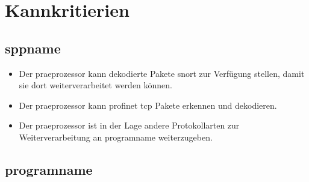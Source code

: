 \section{Kannkritierien}

\subsection{\gls{sppname}}

\begin{itemize}

\item Der \gls{praeprozessor} kann dekodierte Pakete \gls{snort} zur Verfügung stellen, damit sie dort weiterverarbeitet werden können.

\item Der \gls{praeprozessor} kann \gls{profinet} \gls{tcp} Pakete erkennen und dekodieren.

\item Der \gls{praeprozessor} ist in der Lage andere Protokollarten zur Weiterverarbeitung an \gls{programname} weiterzugeben.
\end{itemize}

\subsection{\gls{programname}}

